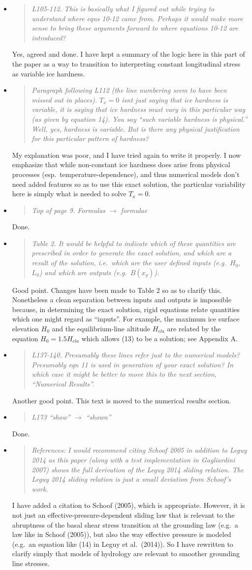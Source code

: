 \documentclass[11pt,reqno]{amsart}
\newcommand{\reply}[2]{
\medskip\medskip
\item  \begin{quote}
\emph{#1}
\end{quote}

\medskip
\noindent #2}
\begin{document}
\begin{itemize}
\reply{L105-112. This is basically what I figured out while trying to understand where eqns 10-12 came from. Perhaps it would make more sense to bring these arguments forward to where equations 10-12 are introduced?}
{Yes, agreed and done.  I have kept a summary of the logic here in this part of the paper as a way to transition to interpreting constant longitudinal stress as variable ice hardness.}

\reply{Paragraph following L112 (the line numbering seem to have been missed out in places). $T_x=0$ isnt just saying that ice hardness is variable, it is saying that ice hardness must vary in this particular way (as given by equation 14).  You say ``such variable hardness is physical.''  Well, yes, hardness is variable. But is there any physical justification for this particular pattern of hardness?}
{My explanation was poor, and I have tried again to write it properly.  I now emphasize that while non-constant ice hardness does arise from physical processes (esp.~temperature-dependence), and thus numerical models don't need added features so as to use this exact solution, the particular variability here is simply what is needed to solve $T_x=0$.}

\reply{Top of page 9. Formulas $\to$ formulae}
{Done.}

\reply{Table 2. It would be helpful to indicate which of these quantities are prescribed in order to generate the exact solution, and which are a result of the solution, i.e.~which are the user defined inputs (e.g.~$H_0$, $L_0$) and which are outputs (e.g.~$B(x_g)$).}
{Good point.  Changes have been made to Table 2 so as to clarify this.  Nonetheless a clean separation between inputs and outputs is impossible because, in determining the exact solution, rigid equations relate quantities which one might regard as ``inputs''.  For example, the maximum ice surface elevation $H_0$ and the equilibrium-line altitude $H_{ela}$ are related by the equation $H_0 = 1.5 H_{ela}$ which allows (13) to be a solution; see Appendix A.}

\reply{L137-140. Presumably these lines refer just to the numerical models? Presumably eqn 11 is used in generation of your exact solution? In which case it might be better to move this to the next section, ``Numerical Results''.}
{Another good point.  This text is moved to the numerical results section.}

\reply{L173 ``show'' $\to$ ``shown''}
{Done.}

\reply{References: I would recommend citing Schoof 2005 in addition to Leguy 2014 as this paper (along with a test implementation in Gagliardini 2007) shows the full derivation of the Leguy 2014 sliding relation. The Leguy 2014 sliding relation is just a small deviation from Schoof's work.}
{I have added a citation to Schoof (2005), which is appropriate.  However, it is not just an effective-pressure-dependent sliding law that is relevant to the abruptness of the basal shear stress transition at the grounding law (e.g.~a law like in Schoof (2005)), but also the way effective pressure is modeled (e.g.~an equation like (14) in Leguy et al.~(2014)).  So I have rewritten to clarify simply that models of hydrology are relevant to smoother grounding line stresses.}

\end{itemize}


%
%
\end{document}
